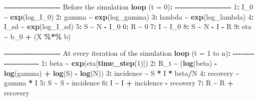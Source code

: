 \documentclass[
11pt, %
oneside, %
english, %
singlespacing, %
]{macthesis} %
\newenvironment{Shaded}{\begin{snugshade}}{\end{snugshade}}
\newcommand{\AttributeTok}[1]{\textcolor[rgb]{0.13,0.29,0.53}{#1}}
\newcommand{\DecValTok}[1]{\textcolor[rgb]{0.00,0.00,0.81}{#1}}
\newcommand{\FunctionTok}[1]{\textcolor[rgb]{0.13,0.29,0.53}{\textbf{#1}}}
\newcommand{\NormalTok}[1]{#1}
\newcommand{\SpecialCharTok}[1]{\textcolor[rgb]{0.81,0.36,0.00}{\textbf{#1}}}
\begin{document}
\begin{Shaded}
\begin{Highlighting}[]
\SpecialCharTok{{-}{-}{-}{-}{-}{-}{-}{-}{-}{-}{-}{-}{-}{-}{-}{-}{-}{-}{-}{-}{-}}
\NormalTok{Before the simulation }\FunctionTok{loop}\NormalTok{ (}\AttributeTok{t =} \DecValTok{0}\NormalTok{)}\SpecialCharTok{:}
\SpecialCharTok{{-}{-}{-}{-}{-}{-}{-}{-}{-}{-}{-}{-}{-}{-}{-}{-}{-}{-}{-}{-}{-}}
\DecValTok{1}\SpecialCharTok{:}\NormalTok{ I\_0 }\SpecialCharTok{\textasciitilde{}} \FunctionTok{exp}\NormalTok{(log\_I\_0)}
\DecValTok{2}\SpecialCharTok{:}\NormalTok{ gamma }\SpecialCharTok{\textasciitilde{}} \FunctionTok{exp}\NormalTok{(log\_gamma)}
\DecValTok{3}\SpecialCharTok{:}\NormalTok{ lambda }\SpecialCharTok{\textasciitilde{}} \FunctionTok{exp}\NormalTok{(log\_lambda)}
\DecValTok{4}\SpecialCharTok{:}\NormalTok{ I\_sd }\SpecialCharTok{\textasciitilde{}} \FunctionTok{exp}\NormalTok{(log\_I\_sd)}
\DecValTok{5}\SpecialCharTok{:}\NormalTok{ S }\SpecialCharTok{\textasciitilde{}}\NormalTok{ N }\SpecialCharTok{{-}}\NormalTok{ I\_0}
\DecValTok{6}\SpecialCharTok{:}\NormalTok{ R }\SpecialCharTok{\textasciitilde{}} \DecValTok{0}
\DecValTok{7}\SpecialCharTok{:}\NormalTok{ I }\SpecialCharTok{\textasciitilde{}}\NormalTok{ I\_0}
\DecValTok{8}\SpecialCharTok{:}\NormalTok{ S }\SpecialCharTok{\textasciitilde{}}\NormalTok{ N }\SpecialCharTok{{-}}\NormalTok{ I }\SpecialCharTok{{-}}\NormalTok{ R}
\DecValTok{9}\SpecialCharTok{:}\NormalTok{ eta }\SpecialCharTok{\textasciitilde{}}\NormalTok{ b\_0 }\SpecialCharTok{+}\NormalTok{ (X }\SpecialCharTok{\%*\%}\NormalTok{ b)}

\SpecialCharTok{{-}{-}{-}{-}{-}{-}{-}{-}{-}{-}{-}{-}{-}{-}{-}{-}{-}{-}{-}{-}{-}}
\NormalTok{At every iteration of the simulation }\FunctionTok{loop}\NormalTok{ (}\AttributeTok{t =} \DecValTok{1}\NormalTok{ to n)}\SpecialCharTok{:}
\SpecialCharTok{{-}{-}{-}{-}{-}{-}{-}{-}{-}{-}{-}{-}{-}{-}{-}{-}{-}{-}{-}{-}{-}}
\DecValTok{1}\SpecialCharTok{:}\NormalTok{ beta }\SpecialCharTok{\textasciitilde{}} \FunctionTok{exp}\NormalTok{(eta[}\FunctionTok{time\_step}\NormalTok{(}\DecValTok{1}\NormalTok{)])}
\DecValTok{2}\SpecialCharTok{:}\NormalTok{ R\_t }\SpecialCharTok{\textasciitilde{}}\NormalTok{ (}\FunctionTok{log}\NormalTok{(beta) }\SpecialCharTok{{-}} \FunctionTok{log}\NormalTok{(gamma) }\SpecialCharTok{+} \FunctionTok{log}\NormalTok{(S) }\SpecialCharTok{{-}} \FunctionTok{log}\NormalTok{(N))}
\DecValTok{3}\SpecialCharTok{:}\NormalTok{ incidence }\SpecialCharTok{\textasciitilde{}}\NormalTok{ S }\SpecialCharTok{*}\NormalTok{ I }\SpecialCharTok{*}\NormalTok{ beta}\SpecialCharTok{/}\NormalTok{N}
\DecValTok{4}\SpecialCharTok{:}\NormalTok{ recovery }\SpecialCharTok{\textasciitilde{}}\NormalTok{ gamma }\SpecialCharTok{*}\NormalTok{ I}
\DecValTok{5}\SpecialCharTok{:}\NormalTok{ S }\SpecialCharTok{\textasciitilde{}}\NormalTok{ S }\SpecialCharTok{{-}}\NormalTok{ incidence}
\DecValTok{6}\SpecialCharTok{:}\NormalTok{ I }\SpecialCharTok{\textasciitilde{}}\NormalTok{ I }\SpecialCharTok{+}\NormalTok{ incidence }\SpecialCharTok{{-}}\NormalTok{ recovery}
\DecValTok{7}\SpecialCharTok{:}\NormalTok{ R }\SpecialCharTok{\textasciitilde{}}\NormalTok{ R }\SpecialCharTok{+}\NormalTok{ recovery}


\end{Highlighting}
\end{Shaded}
\end{document}
